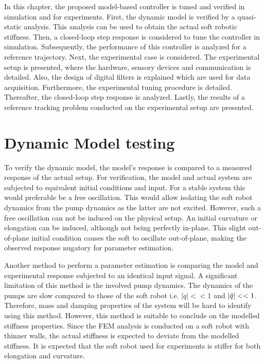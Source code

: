 \label{chap5}




In this chapter, the proposed model-based controller is tuned and verified in simulation and for experiments. First, the dynamic model is verified by a quasi-static analysis. This analysis can be used to obtain the actual soft robotic stiffness. Then, a closed-loop step response is considered to tune the controller in simulation. Subsequently, the performance of this controller is analyzed for a reference trajectory. Next, the experimental case is considered. The experimental setup is presented, where the hardware, sensory devices and communication is detailed. Also, the design of digital filters is explained which are used for data acquisition. Furthermore, the experimental tuning procedure is detailed. Thereafter, the closed-loop step response is analyzed. Lastly, the results of a reference tracking problem conducted on the experimental setup are presented. 



\section{Dynamic Model testing}



To verify the dynamic model, the model's response is compared to a measured response of the actual setup. For verification, the model and actual system are subjected to equivalent initial conditions and input. For a stable system this would preferable be a free oscillation. This would allow isolating the soft robot dynamics from the pump dynamics as the latter are not excited. However, such a free oscillation can not be induced on the physical setup. An initial curvature or elongation can be induced, although not being perfectly in-plane. This slight out-of-plane initial condition causes the soft to oscillate out-of-plane, making the observed response nugatory for parameter estimation.


Another method to perform a parameter estimation is comparing the model and experimental response subjected to an identical input signal. A significant limitation of this method is the involved pump dynamics. The dynamics of the pumps are slow compared to those of the soft robot i.e. $|\dot{q}|<< 1$ and $|\Ddot{q}|<< 1 $. Therefore, mass and damping properties of the system will be hard to identify using this method. However, this method is suitable to conclude on the modelled stiffness properties. Since the FEM analysis is conducted on a soft robot with thinner walls, the actual stiffness is expected to deviate from the modelled stiffness. It is expected that the soft robot used for experiments is stiffer for both elongation and curvature. 

